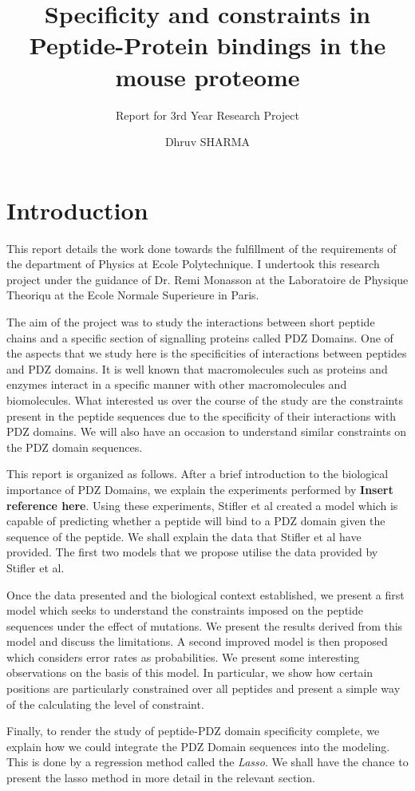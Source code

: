 \documentclass[a4paper, 12pt]{article}
\title{Specificity and constraints in Peptide-Protein bindings in the mouse proteome}
\subtitle{Report for 3rd Year Research Project}
\author{Dhruv SHARMA}
\begin{document}
\pagebreak
\maketitle
\tableofcontents
\pagebreak
\part{Introduction}
	This report details the work done towards the fulfillment of the requirements of the department of Physics at Ecole Polytechnique. I undertook this research project under the guidance of Dr. Remi Monasson at the Laboratoire de Physique Theoriqu at the Ecole Normale Superieure in Paris. 

	The aim of the project was to study the interactions between short peptide chains and a specific section of signalling proteins called PDZ Domains. One of the aspects that we study here is the specificities of interactions between peptides and PDZ domains. It is well known that macromolecules such as proteins and enzymes interact in a specific manner with other macromolecules and biomolecules. What interested us over the course of the study are the constraints present in the peptide sequences due to the specificity of their interactions with PDZ domains. We will also have an occasion to understand similar constraints on the PDZ domain sequences. 

	This report is organized as follows. After a brief introduction to the biological importance of PDZ Domains, we explain the experiments performed by \textbf{Insert reference here}. Using these experiments, Stifler et al created a model which is capable of predicting whether a peptide will bind to a PDZ domain given the sequence of the peptide. We shall explain the data that Stifler et al have provided. The first two models that we propose utilise the data provided by Stifler et al. 

	Once the data presented and the biological context established, we present a first model which seeks to understand the constraints imposed on the peptide sequences under the effect of mutations. We present the results derived from this model and discuss the limitations. A second improved model is then proposed which considers error rates as probabilities. We present some interesting observations on the basis of this model. In particular, we show how certain positions are particularly constrained over all peptides and present a simple way of the calculating the level of constraint. 

	Finally, to render the study of peptide-PDZ domain specificity complete, we explain how we could integrate the PDZ Domain sequences into the modeling. This is done by a regression method called the \textit{Lasso}. We shall have the chance to present the lasso method in more detail in the relevant section. 
\end{document}
